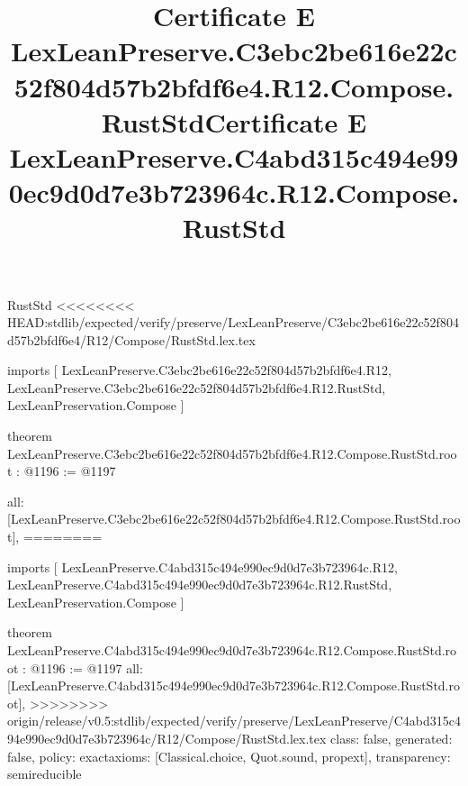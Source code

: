\begin{lexlean}{RustStd}
<<<<<<<< HEAD:stdlib/expected/verify/preserve/LexLeanPreserve/C3ebc2be616e22c52f804d57b2bfdf6e4/R12/Compose/RustStd.lex.tex
\title{Certificate E LexLeanPreserve.C3ebc2be616e22c52f804d57b2bfdf6e4.R12.Compose.RustStd}
\begin{coremodule}
imports [
  LexLeanPreserve.C3ebc2be616e22c52f804d57b2bfdf6e4.R12,
  LexLeanPreserve.C3ebc2be616e22c52f804d57b2bfdf6e4.R12.RustStd,
  LexLeanPreservation.Compose
]

theorem LexLeanPreserve.C3ebc2be616e22c52f804d57b2bfdf6e4.R12.Compose.RustStd.root : @1196 := @1197 {
  all: [LexLeanPreserve.C3ebc2be616e22c52f804d57b2bfdf6e4.R12.Compose.RustStd.root],
========
\title{Certificate E LexLeanPreserve.C4abd315c494e990ec9d0d7e3b723964c.R12.Compose.RustStd}
\begin{coremodule}
imports [
  LexLeanPreserve.C4abd315c494e990ec9d0d7e3b723964c.R12,
  LexLeanPreserve.C4abd315c494e990ec9d0d7e3b723964c.R12.RustStd,
  LexLeanPreservation.Compose
]

theorem LexLeanPreserve.C4abd315c494e990ec9d0d7e3b723964c.R12.Compose.RustStd.root : @1196 := @1197 {
  all: [LexLeanPreserve.C4abd315c494e990ec9d0d7e3b723964c.R12.Compose.RustStd.root],
>>>>>>>> origin/release/v0.5:stdlib/expected/verify/preserve/LexLeanPreserve/C4abd315c494e990ec9d0d7e3b723964c/R12/Compose/RustStd.lex.tex
  class: false,
  generated: false,
  policy: exact{axioms: [Classical.choice, Quot.sound, propext]},
  transparency: semireducible
}


\end{coremodule}}
\end{coremodule}
\end{lexlean}
